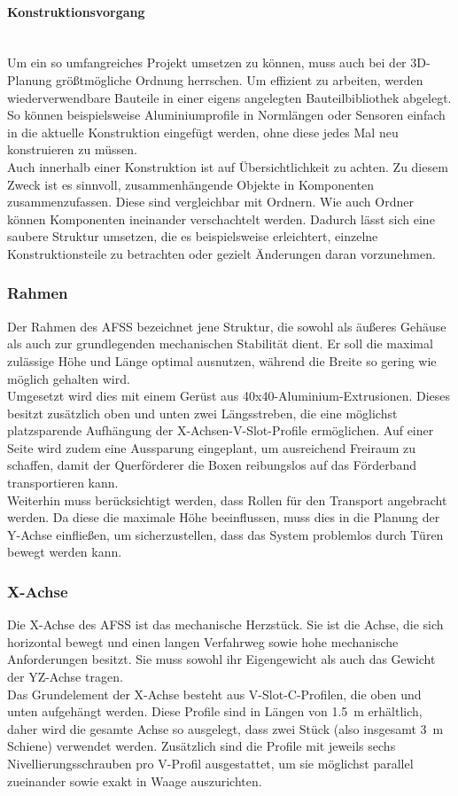 \paragraph{Konstruktionsvorgang}\mbox{}\\
Um ein so umfangreiches Projekt umsetzen zu können, muss auch bei der 3D-Planung größtmögliche Ordnung herrschen. Um effizient zu arbeiten, werden wiederverwendbare Bauteile in einer eigens angelegten Bauteilbibliothek abgelegt. So können beispielsweise Aluminiumprofile in Normlängen oder Sensoren einfach in die aktuelle Konstruktion eingefügt werden, ohne diese jedes Mal neu konstruieren zu müssen.
\\
Auch innerhalb einer Konstruktion ist auf Übersichtlichkeit zu achten. Zu diesem Zweck ist es sinnvoll, zusammenhängende Objekte in Komponenten zusammenzufassen. Diese sind vergleichbar mit Ordnern. Wie auch Ordner können Komponenten ineinander verschachtelt werden. Dadurch lässt sich eine saubere Struktur umsetzen, die es beispielsweise erleichtert, einzelne Konstruktionsteile zu betrachten oder gezielt Änderungen daran vorzunehmen.


\subsubsection{Rahmen}

Der Rahmen des AFSS bezeichnet jene Struktur, die sowohl als äußeres Gehäuse als auch zur grundlegenden mechanischen Stabilität dient. Er soll die maximal zulässige Höhe und Länge optimal ausnutzen, während die Breite so gering wie möglich gehalten wird.
\\
Umgesetzt wird dies mit einem Gerüst aus 40x40-Aluminium-Extrusionen. Dieses besitzt zusätzlich oben und unten zwei Längsstreben, die eine möglichst platzsparende Aufhängung der X-Achsen-V-Slot-Profile ermöglichen. Auf einer Seite wird zudem eine Aussparung eingeplant, um ausreichend Freiraum zu schaffen, damit der Querförderer die Boxen reibungslos auf das Förderband transportieren kann.
\\
Weiterhin muss berücksichtigt werden, dass Rollen für den Transport angebracht werden. Da diese die maximale Höhe beeinflussen, muss dies in die Planung der Y-Achse einfließen, um sicherzustellen, dass das System problemlos durch Türen bewegt werden kann.

\subsubsection{X-Achse}
Die X-Achse des AFSS ist das mechanische Herzstück. Sie ist die Achse, die sich horizontal bewegt und einen langen Verfahrweg sowie hohe mechanische Anforderungen besitzt. Sie muss sowohl ihr Eigengewicht als auch das Gewicht der YZ-Achse tragen.
\\
Das Grundelement der X-Achse besteht aus V-Slot-C-Profilen, die oben und unten aufgehängt werden. Diese Profile sind in Längen von \SI{1.5}{\meter} erhältlich, daher wird die gesamte Achse so ausgelegt, dass zwei Stück (also insgesamt \SI{3}{\meter} Schiene) verwendet werden. Zusätzlich sind die Profile mit jeweils sechs Nivellierungsschrauben pro V-Profil ausgestattet, um sie möglichst parallel zueinander sowie exakt in Waage auszurichten.

